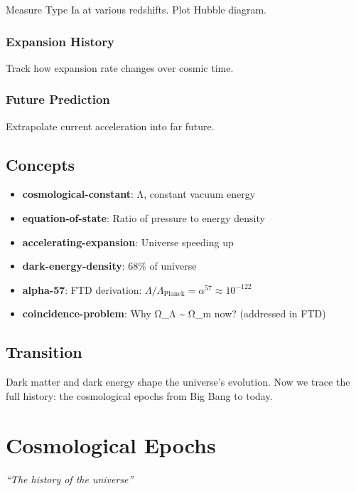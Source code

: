 \documentclass[
  11pt,
  letterpaper,
  twoside,
  openright]{book}
\providecommand{\tightlist}{%
  \setlength{\itemsep}{0pt}\setlength{\parskip}{0pt}}
\begin{document}
Measure Type Ia at various redshifts. Plot Hubble diagram.

\subsection{Expansion History}\label{expansion-history}

Track how expansion rate changes over cosmic time.

\subsection{Future Prediction}\label{future-prediction}

Extrapolate current acceleration into far future.

\section{Concepts}\label{concepts-30}

\begin{itemize}
\tightlist
\item
  \textbf{cosmological-constant}: Λ, constant vacuum energy
\item
  \textbf{equation-of-state}: Ratio of pressure to energy density
\item
  \textbf{accelerating-expansion}: Universe speeding up
\item
  \textbf{dark-energy-density}: 68\% of universe
\item
  \textbf{alpha-57}: FTD derivation:
  \(\Lambda/\Lambda_{\text{Planck}} = \alpha^{57} \approx 10^{-122}\)
\item
  \textbf{coincidence-problem}: Why Ω\_Λ \textasciitilde{} Ω\_m now?
  (addressed in FTD)
\end{itemize}

\section{Transition}\label{transition-30}

Dark matter and dark energy shape the universe's evolution. Now we trace
the full history: the cosmological epochs from Big Bang to today.

\chapter{Cosmological Epochs}\label{sec-cosmological-epochs}

\emph{``The history of the universe''}
\end{document}
